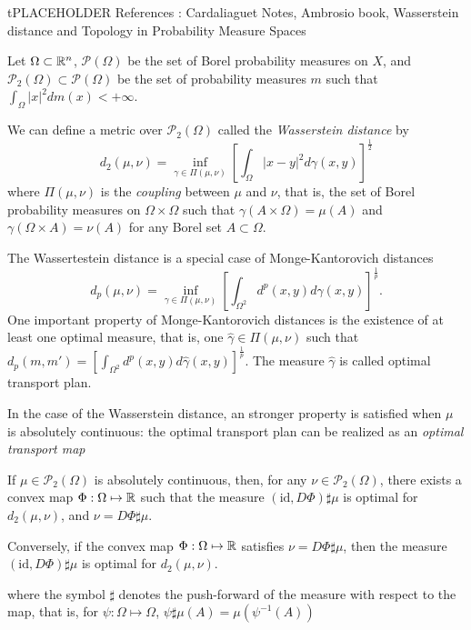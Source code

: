tPLACEHOLDER
References : Cardaliaguet Notes, Ambrosio book, 
Wasserstein distance and Topology in Probability Measure Spaces

Let $\Omega \subset \mathbb{R}^n$, $\mathcal{P}(\Omega)$ be the set of Borel
probability measures on $X$, and $\mathcal{P}_2(\Omega) \subset \mathcal{P}(\Omega)$
be the set of probability measures $m$ such that $\int_\Omega |x|^2 dm(x) < + \infty$.

We can define a metric over $\mathcal{P}_2(\Omega)$ called the 
\textit{Wasserstein distance} by
\begin{equation}\label{prob_measures:wasserstein_distance}
    d_2(\mu, \nu) = \inf_{\gamma \in \Pi(\mu,\nu)} \left[ \int_\Omega |x - y|^2 d\gamma(x,y) \right]^{\frac{1}{2}}
\end{equation}
where $\Pi(\mu,\nu)$ is the \textit{coupling} between $\mu$  and $\nu$,
that is, the set of Borel probability measures on $\Omega \times \Omega$
such that $\gamma(A \times \Omega) = \mu(A)$ and $\gamma(\Omega \times A) = \nu(A)$
for any Borel set $A \subset \Omega$.

The Wassertestein distance is a special case of Monge-Kantorovich distances
\begin{equation*}
    d_p(\mu, \nu) = \inf_{\gamma \in \Pi(\mu, \nu)} \left[ \int_{\Omega^2} d^p(x,y) d\gamma(x,y)  \right]^{\frac{1}{p}}.
\end{equation*}
One important property of Monge-Kantorovich distances is the existence of at least
one optimal measure, that is, one $\hat  \gamma \in \Pi(\mu,\nu)$ such that
$d_p(m,m') = \left[ \int_{\Omega^2} d^p(x,y) d {\hat \gamma}(x,y) \right]^{\frac{1}{p}}$.
The measure $\hat \gamma$ is called optimal transport plan.

In the case of the Wasserstein distance, an stronger property is satisfied when 
$\mu$ is absolutely continuous: the optimal transport plan can be realized as
an \textit{optimal transport map}
\begin{theorem}
    If $\mu \in \mathcal{P}_2(\Omega)$ is absolutely continuous, then,
    for any $\nu \in \mathcal{P}_2(\Omega)$, there exists a convex map 
    $\Phi: \Omega \mapsto \mathbb{R} $ such that the measure
    $ (\text{id}, D\Phi)\sharp \mu $ is optimal for $d_2(\mu, \nu)$, and $\nu = D \Phi \sharp \mu$.

    Conversely, if the convex map $\Phi : \Omega \mapsto \mathbb{R}$ satisfies $\nu = D \Phi \sharp \mu$,
    then the measure $(\text{id}, D\Phi)\sharp \mu$ is optimal for $d_ 2(\mu,\nu)$.
\end{theorem}
where the symbol $\sharp$ denotes the push-forward of the measure with respect to the map,
that is, for $\psi : \Omega \mapsto \Omega$, $\psi \sharp \mu(A) = \mu(\psi^{-1}(A))$


